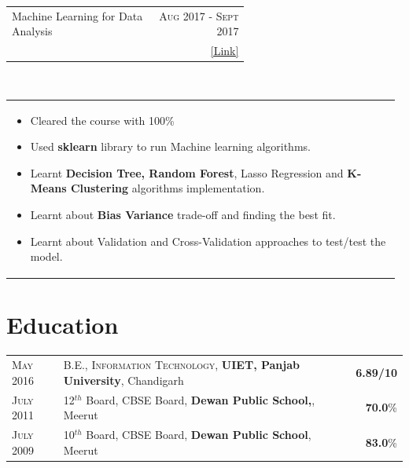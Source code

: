 \documentclass[a4paper]{article} %
\newcommand{\verticalspacing}{-0.25cm}
\newcommand{\bulletspace}{0.7cm}
\newcommand{\projectheadspacing}{6.9cm}
\newcommand{\cproject}[5]{%
    \begin{tabular}{p{0.60\linewidth}r}
        \textcolor{NavyBlue}{\small #2} & \multicolumn{1}{m{ \projectheadspacing{} }}{\raggedleft \small {\textsc{#1}}}\\
        \small {#3} & \small {#4}
    \end{tabular}\\
    \begin{tabular}{p{0.98\linewidth}}
    \vspace{-0.3cm}
        \small{#5}
    \end{tabular}
    \vspace{\verticalspacing{}}
}
\begin{document}
\cproject
    {Aug 2017 - Sept 2017}
    {Machine Learning for Data Analysis}
    {\textsc{\raggedright Machine Learning, Coursera}}
    {\href{https://www.coursera.org/account/accomplishments/certificate/HAKPGPJLA3ST} {[Link]}}
    {%
        \begin{itemize}[leftmargin=\bulletspace{}]
            \item Cleared the course with 100\%
            \item Used \textbf{sklearn} library to run Machine learning algorithms.
            \item Learnt \textbf{Decision Tree, Random Forest}, Lasso Regression and \textbf{K-Means Clustering} algorithms implementation.
            \item Learnt about \textbf{Bias Variance} trade-off and finding the best fit.
            \item Learnt about Validation and Cross-Validation approaches to test/test the model.
        \end{itemize}
    }




\section{Education}
\def\arraystretch{1.2}
\begin{tabular}{>{\raggedleft}p{1.5cm}p{14.6cm}r}

    \textsc{May 2016} & B.E., \textsc{Information Technology},
    \textbf{UIET, Panjab University}, Chandigarh
    & \textbf{6.89/10}\\

    \textsc{July 2011} & 12$^{th}$ Board, \textsc{CBSE} Board,
    \textbf{Dewan Public School,}, Meerut
    & \textbf{70.0}\% \\

    \textsc{July 2009} & 10$^{th}$ Board, \textsc{CBSE} Board,
    \textbf{Dewan Public School}, Meerut
    & \textbf{83.0}\% \\

\end{tabular}
\def\arraystretch{1}


\end{document}
